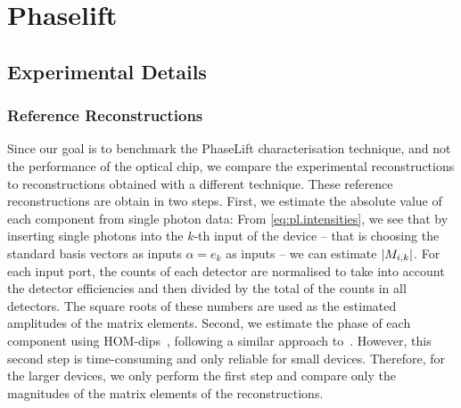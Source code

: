 
\chapter{Phaselift}
\label{cha:phaselift_appendix}

\section{Experimental Details}%
\label{sec:pl.experimental_details}


\subsection{Reference Reconstructions}%
\label{sub:pl.hom_dip}

Since our goal is to benchmark the PhaseLift characterisation technique, and not the performance of the optical chip, we compare the experimental reconstructions to reconstructions obtained with a different technique.
These reference reconstructions are obtain in two steps.
First, we estimate the absolute value of each component from single photon data:
From \cref{eq:pl.intensities}, we see that by inserting single photons into the $k$-th input of the device -- that is choosing the standard basis vectors as inputs $\alpha =  e_k$ as inputs --  we can estimate ${\vert M_{i,k}\vert}$.
For each input port, the counts of each detector are normalised to take into account the detector efficiencies and then divided by the total of the counts in all detectors.
The square roots of these numbers are used as the estimated amplitudes of the matrix elements.
Second, we estimate the phase of each component using HOM-dips~\cite{Hong_1987_Measurement}, following a similar approach to~\cite{Laing_2012_SuperStable,Dhand_2016_Accurate}.
However, this second step is time-consuming and only reliable for small devices.
Therefore, for the larger devices, we only perform the first step and compare only the magnitudes of the matrix elements of the reconstructions.

